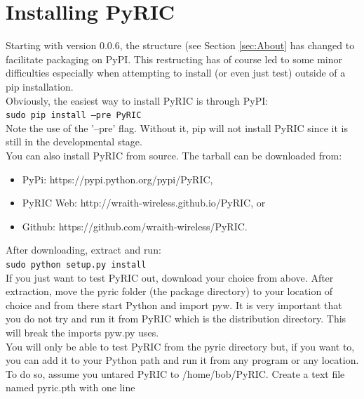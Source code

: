 \documentclass[11pt]{article}
\begin{document}
\section{Installing PyRIC}\label{sec:installing}
Starting with version 0.0.6, the structure (see Section \ref{sec:About} has 
changed to facilitate packaging on PyPI. This restructing has of course led 
to some minor difficulties especially when attempting to install (or even 
just test) outside of a pip installation. \\

Obviously, the easiest way to install PyRIC is through PyPI:\\

    \texttt{sudo pip install --pre PyRIC}\\

Note the use of the '--pre' flag. Without it, pip will not install PyRIC since
it is still in the developmental stage.\\

You can also install PyRIC from source. The tarball can be downloaded from:

\begin{itemize}
\item PyPi: https://pypi.python.org/pypi/PyRIC,
\item PyRIC Web: http://wraith-wireless.github.io/PyRIC, or
\item Github: https://github.com/wraith-wireless/PyRIC.
\end{itemize}

After downloading, extract and run:\\

	\texttt{sudo python setup.py install}\\

If you just want to test PyRIC out, download your choice from above. After 
extraction, move the pyric folder (the package directory) to your location of 
choice and from there start Python and import pyw. It is very important that you
do not try and run it from PyRIC which is the distribution directory. This will 
break the imports pyw.py uses. \\

You will only be able to test PyRIC from the pyric directory but, if you want to,
you can add it to your Python path and run it from any program or any location.
To do so, assume you untared PyRIC to /home/bob/PyRIC. Create a text file named
pyric.pth with one line \\
\end{document}
